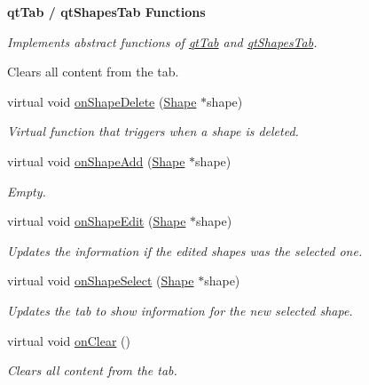 \begin{Indent}{\bf qt\+Tab / qt\+Shapes\+Tab Functions}\par
{\em Implements abstract functions of \hyperlink{classqt_tab}{qt\+Tab} and \hyperlink{classqt_shapes_tab}{qt\+Shapes\+Tab}.

Clears all content from the tab. }\begin{DoxyCompactItemize}
\item 
virtual void \hyperlink{classqt_shape_info_tab_a295e58538f2cebdfd9a4b5b40bf1e16c}{on\+Shape\+Delete} (\hyperlink{class_shape}{Shape} $\ast$shape)
\begin{DoxyCompactList}\small\item\em Virtual function that triggers when a shape is deleted. \end{DoxyCompactList}\item 
\hypertarget{classqt_shape_info_tab_aec9838aa8baceca3a6045b5950e2881d}{}virtual void \hyperlink{classqt_shape_info_tab_aec9838aa8baceca3a6045b5950e2881d}{on\+Shape\+Add} (\hyperlink{class_shape}{Shape} $\ast$shape)\label{classqt_shape_info_tab_aec9838aa8baceca3a6045b5950e2881d}

\begin{DoxyCompactList}\small\item\em Empty. \end{DoxyCompactList}\item 
virtual void \hyperlink{classqt_shape_info_tab_acc7e4b91ec5eff4e8a785730a21a44f8}{on\+Shape\+Edit} (\hyperlink{class_shape}{Shape} $\ast$shape)
\begin{DoxyCompactList}\small\item\em Updates the information if the edited shapes was the selected one. \end{DoxyCompactList}\item 
\hypertarget{classqt_shape_info_tab_a785dda79e10dfd05845e08ab1b4cdfd9}{}virtual void \hyperlink{classqt_shape_info_tab_a785dda79e10dfd05845e08ab1b4cdfd9}{on\+Shape\+Select} (\hyperlink{class_shape}{Shape} $\ast$shape)\label{classqt_shape_info_tab_a785dda79e10dfd05845e08ab1b4cdfd9}

\begin{DoxyCompactList}\small\item\em Updates the tab to show information for the new selected shape. \end{DoxyCompactList}\item 
\hypertarget{classqt_shape_info_tab_ae7f1b60ab068ec55b67830742e7534d8}{}virtual void \hyperlink{classqt_shape_info_tab_ae7f1b60ab068ec55b67830742e7534d8}{on\+Clear} ()\label{classqt_shape_info_tab_ae7f1b60ab068ec55b67830742e7534d8}

\begin{DoxyCompactList}\small\item\em Clears all content from the tab. \end{DoxyCompactList}\end{DoxyCompactItemize}
\end{Indent}


